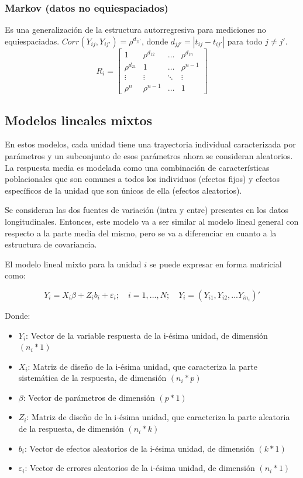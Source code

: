 \documentclass[12pt]{article}
\begin{document}
\subsubsection{Markov (datos no equiespaciados)}

Es una generalización de la estructura autorregresiva para mediciones no equiespaciadas.
$Corr(Y_{ij}, Y_{ij'}) = \rho^{d_{jj'}}$, donde $d_{jj'} = |t_{ij} - t_{ij'}|$ para todo $j \neq j'$.
\[
R_i =
\begin{bmatrix}
	1      		  & \rho^{d_{12}} & \dots  & \rho^{d_{1n}} \\
	\rho^{d_{21}} & 1     		  & \dots  & \rho^{n-1} \\
	\vdots 		  & \vdots		  & \ddots & \vdots \\
	\rho^n 		  & \rho^{n-1}    & \dots  & 1
\end{bmatrix}
\]

\subsection{Modelos lineales mixtos}

En estos modelos, cada unidad tiene una trayectoria individual caracterizada por parámetros y un subconjunto de esos
parámetros ahora se consideran aleatorios. La respuesta media es modelada como una combinación de características
poblacionales que son comunes a todos los individuos (efectos fijos) y efectos específicos de la unidad que son únicos
de ella (efectos aleatorios).

Se consideran las dos fuentes de variación (intra y entre) presentes en los datos longitudinales. Entonces, este modelo
va a ser similar al modelo lineal general con respecto a la parte media del mismo, pero se va a diferenciar en cuanto
a la estructura de covariancia.

El modelo lineal mixto para la unidad $i$ se puede expresar en forma matricial como:

\[ Y_i = X_i\beta + Z_ib_i + \varepsilon_i; \quad i = 1, ..., N; \quad Y_i = (Y_{i1}, Y_{i2}, ... Y_{in_{i}})' \]

Donde:

\begin{itemize}
	\item $Y_i$: Vector de la variable respuesta de la i-ésima unidad, de dimensión $(n_i*1)$
	\item $X_i$: Matriz de diseño de la i-ésima unidad, que caracteriza la parte sistemática de la respuesta, de dimensión $(n_i*p)$
	\item $\beta$: Vector de parámetros de dimensión $(p*1)$
	\item $Z_i$: Matriz de diseño de la i-ésima unidad, que caracteriza la parte aleatoria de la respuesta, de dimensión $(n_i*k)$
	\item $b_i$: Vector de efectos aleatorios de la i-ésima unidad, de dimensión $(k*1)$
	\item $\varepsilon_i$: Vector de errores aleatorios de la i-ésima unidad, de dimensión $(n_i*1)$
\end{itemize}
\end{document}
